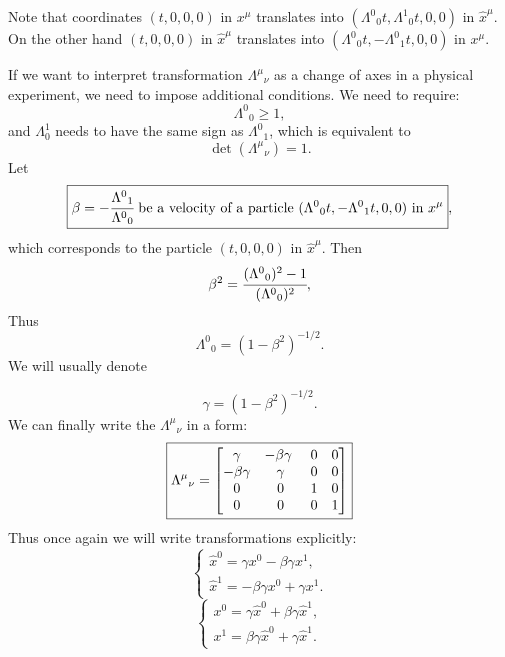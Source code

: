 \documentclass[main.tex]{subfiles}
\begin{document}
Note that coordinates $(t, 0, 0, 0)$ in $x^\mu$ translates into $({\Lambda^0}_0 t, {\Lambda^1}_0 t, 0, 0)$ in $\hat{x}^\mu$. On the other hand $(t, 0, 0, 0)$ in $\hat{x}^\mu$ translates into 
$({\Lambda^0}_0 t, -{\Lambda^0}_1 t, 0, 0)$ in $x^\mu$.

If we want to interpret transformation ${\Lambda^\mu}_\nu$ as a change of axes in a physical experiment, we need to impose additional conditions. We need to require:
\begin{equation}
    \boxed{{\Lambda^0}_0 \geq 1},
\end{equation}
and $\Lambda^1_0$ needs to have the same sign as ${\Lambda^0}_1$, which is equivalent to
\begin{equation}
    \boxed{\det({\Lambda^\mu}_\nu) = 1}.
\end{equation}
Let $$\boxed{\beta = -\cfrac{{\Lambda^0}_1}{{\Lambda^0}_0} \text{ be a velocity of a particle } ({\Lambda^0}_0 t, -{\Lambda^0}_1 t, 0, 0) \text{ in } x^\mu},$$ which corresponds to the particle $(t, 0, 0, 0)$ in $\hat{x}^\mu$. Then
\begin{equation}
    \beta^2 = \cfrac{({\Lambda^0}_0)^2 - 1}{({\Lambda^0}_0)^2},
\end{equation}
Thus 
\begin{equation}
    {\Lambda^0}_0 = (1 - \beta^2)^{-1/2}.
\end{equation}
We will usually denote

$$\boxed{\gamma = (1 - \beta^2)^{-1/2}}.$$
We can finally write the ${\Lambda^\mu}_\nu$ in a form:
\begin{equation}
\boxed{
\label{lorentz_3}
    {\Lambda^\mu}_\nu =
    \begin{bmatrix}
    \gamma & -\beta \gamma \ & 0 & 0 \\
    -\beta \gamma & \gamma & 0 & 0 \\
    0 & 0 & 1 & 0 \\
    0 & 0 & 0 & 1 \\
\end{bmatrix}}
\end{equation}
Thus once again we will write transformations explicitly:
\begin{equation}
\label{lorentz-trans-1}
\boxed{
\begin{cases}
    \hat{x}^0 = \gamma x^0 - \beta \gamma x^1, \\
    \hat{x}^1 = -\beta \gamma x^0 + \gamma x^1.
\end{cases}}
\end{equation}
\begin{equation}
\boxed{
\begin{cases}
    x^0 = \gamma \hat{x}^0 + \beta \gamma \hat{x}^1, \\
    x^1 = \beta \gamma \hat{x}^0 + \gamma \hat{x}^1.
\end{cases}}
\end{equation}
\end{document}
